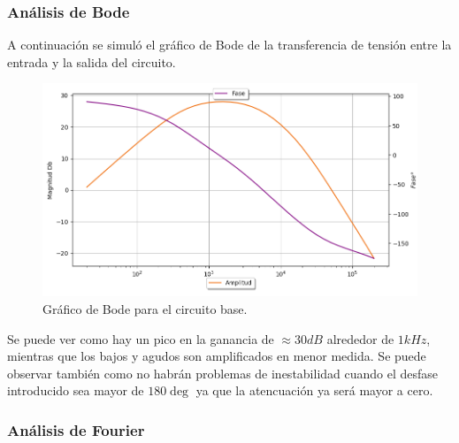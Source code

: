 \subsubsection{Análisis de Bode}
A continuación se simuló el gráfico de Bode de la transferencia de tensión entre la entrada y la salida del circuito.
\begin{figure}[H]
	\centering
	\includegraphics[width=1\textwidth, trim={0 0 0 0}, clip]{Ejercicio5/Imagenes/Circuito_base/Sim/circuito_base_bode.png}
	\caption{Gráfico de Bode para el circuito base.}
	\label{fig:sim_base}
\end{figure}

Se puede ver como hay un pico en la ganancia de $\approx 30dB$ alrededor de $1kHz$, mientras que los bajos y agudos son amplificados en menor medida. Se puede observar también como no habrán problemas de inestabilidad cuando el desfase introducido sea mayor de $180\deg$ ya que la atencuación ya será mayor a cero.

\subsubsection{Análisis de Fourier}

